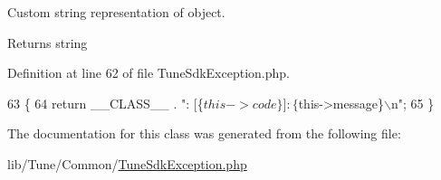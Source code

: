 Custom string representation of object. 

\begin{DoxyReturn}{Returns}
string 
\end{DoxyReturn}


Definition at line 62 of file Tune\-Sdk\-Exception.\-php.


\begin{DoxyCode}
63     \{
64         \textcolor{keywordflow}{return} \_\_CLASS\_\_ . \textcolor{stringliteral}{": [\{$this->code\}]: \{$this->message\}\(\backslash\)n"};
65     \}
\end{DoxyCode}


The documentation for this class was generated from the following file\-:\begin{DoxyCompactItemize}
\item 
lib/\-Tune/\-Common/\hyperlink{TuneSdkException_8php}{Tune\-Sdk\-Exception.\-php}\end{DoxyCompactItemize}
